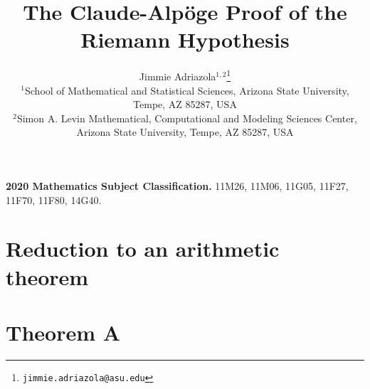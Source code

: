 \documentclass[11pt,letterpaper]{article}
\title{\bfseries The Claude-Alp\"oge Proof of the Riemann Hypothesis}
\author{Jimmie Adriazola$^{1,2}$\thanks{\texttt{jimmie.adriazola@asu.edu}}\\[6pt]
\small $^1$School of Mathematical and Statistical Sciences, Arizona State University,\\[-2pt]
\small Tempe, AZ 85287, USA\\[3pt]
\small $^2$Simon A. Levin Mathematical, Computational and Modeling Sciences Center,\\[-2pt]
\small Arizona State University, Tempe, AZ 85287, USA}
\date{}
\theoremstyle{plain}
\theoremstyle{definition}
\theoremstyle{remark}
\numberwithin{equation}{section}
\begin{document}
\maketitle



\noindent\textbf{2020 Mathematics Subject Classification.} 11M26, 11M06, 11G05, 11F27, 11F70, 11F80, 14G40.

\tableofcontents



\part{Reduction to an arithmetic theorem}






\part{Theorem A}















\end{document}
